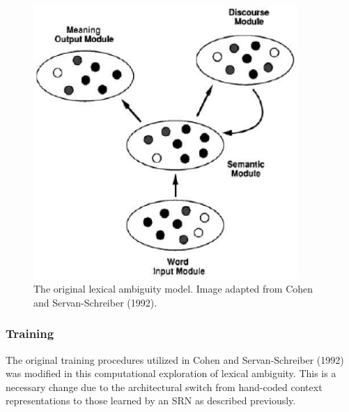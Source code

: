 \begin{figure}[tp]
\begin{center}
	\includegraphics[width=100mm]{figures/Cohen_ServanSchreiber_Model.eps}
\end{center}
\caption{The original lexical ambiguity model. Image adapted from Cohen and Servan-Schreiber (1992).}
\label{cohen-servan-schreiber-model}
\end{figure} 

\subsubsection{Training}
The original training procedures utilized in Cohen and Servan-Schreiber (1992) was modified in this computational exploration of lexical ambiguity.  This is a necessary change due to the architectural switch from hand-coded context representations to those learned by an SRN as described previously.  

